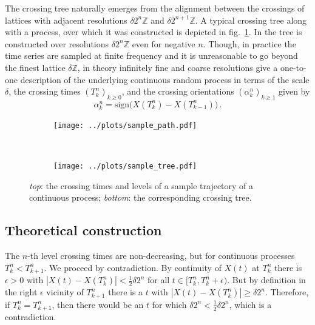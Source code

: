 \documentclass[a4paper]{article}
\begin{document}
The crossing tree naturally emerges from the alignment between the crossings of
lattices with adjacent resolutions $\delta 2^n \mathbb{Z}$ and $\delta 2^{n+1} \mathbb{Z}$.
A typical crossing tree along with a process, over which it was constructed is depicted
in fig.~\ref{fig:sample_tree}. In \cite{decrouez2013,ECP1673} the tree is constructed
over resolutions $\delta 2^n \mathbb{Z}$ even for negative $n$. Though, in practice
the time series are sampled at finite frequency and it is unreasonable to go beyond
the finest lattice $\delta \mathbb{Z}$, in theory infinitely fine and coarse resolutions
give a one-to-one description of the underlying continuous random process in terms
of the scale $\delta$, the crossing times $(T_k^n)_{k\geq 0}$, and the crossing
orientations $(\alpha_k^n)_{k\geq 1}$ given by
\begin{equation*} \label{eq:xing_orientations}
    \alpha_k^n = \text{sign}\bigl( X(T_k^n) - X(T_{k-1}^n) \bigr) \,.
\end{equation*}

\begin{figure}[ht]
    \centering
    \begin{subfigure}{\linewidth}
        \texttt{[image: ../plots/sample\_path.pdf]}
    \end{subfigure}\\
    \vspace{-20pt}
    \begin{subfigure}{\linewidth}
        \texttt{[image: ../plots/sample\_tree.pdf]}
    \end{subfigure}
    \vspace{-10pt}
    \caption{\emph{top}: the crossing times and levels of a sample trajectory of
    a continuous process; \emph{bottom}: the corresponding crossing tree.}
    \label{fig:sample_tree}
    \vspace{-10pt}
\end{figure}

\subsection{Theoretical construction} %
\label{sub:theoretical_construction}

The $n$-th level crossing times are non-decreasing, but for continuous processes
$T_k^n < T_{k+1}^n$. We proceed by contradiction. By continuity of $X(t)$ at $T_k^n$
there is $\epsilon>0$ with $|X(t) - X(T_k^n)| < \frac{1}{2}\delta 2^n$ for all
$t\in [T_k^n, T_k^n + \epsilon)$. But by definition in the right $\epsilon$ vicinity
of $T_{k+1}^n$ there is a $t$ with $|X(t) - X(T_k^n)|\geq \delta 2^n$. Therefore,
if $T_k^n = T_{k+1}^n$, then there would be an $t$ for which $\delta 2^n < \frac{1}{2}\delta 2^n$,
which is a contradiction.
\end{document}
